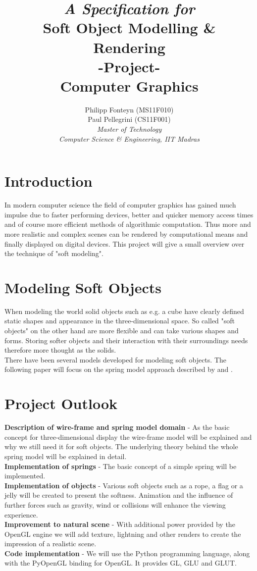 \documentclass[11pt]{article}
\title{
	\emph{A Specification for}\\
	\huge{\textbf{Soft Object Modelling \& Rendering} }\\
	-Project-\\
	Computer Graphics\\[2em]	
}
\author{
	Philipp Fonteyn (MS11F010)\\
	Paul Pellegrini (CS11F001)\\[2em]
	\emph{Master of Technology}\\
	\emph{Computer Science \& Engineering, IIT Madras}
}
\begin{document}
\maketitle
\newpage

%
%
%
\section{Introduction}
In modern computer science the field of computer graphics has gained much impulse due to faster performing devices, better and quicker memory access times and of course more efficient methods of algorithmic computation. Thus more and more realistic and complex scenes can be rendered by computational means and finally displayed on digital devices. This project will give a small overview over the technique of "soft modeling".
%
%
%
\section{Modeling Soft Objects}
When modeling the world solid objects such as e.g. a cube have clearly defined static shapes and appearance in the three-dimensional space. So called "soft objects" on the other hand are more flexible and can take various shapes and forms. Storing softer objects and their interaction with their surroundings needs therefore more thought as the solids.\\[1em]
%
There have been several models developed for modeling soft objects. The following paper will focus on the spring model approach described by \cite{LSCS} and \cite{hair}\cite{gama}.

%
%
%
\section{Project Outlook}
%
\textbf{Description of wire-frame and spring model domain} - As the basic concept for three-dimensional display the wire-frame model will be explained and why we still need it for soft objects. The underlying theory behind the whole spring model will be explained in detail.\\[1em]
%
\textbf{Implementation of springs} - The basic concept of a simple spring will be implemented.\\[1em]
%
\textbf{Implementation of objects} - Various soft objects such as a rope, a flag or a jelly will be created to present the softness. Animation and the influence of further forces such as gravity, wind or collisions will enhance the viewing experience.\\[1em]
%
\textbf{Improvement to natural scene} - With additional power provided by the OpenGL engine \cite{opengl} we will add texture, lightning and other renders to create the impression of a realistic scene.\\[1em]
%
\textbf{Code implementation} - We will use the Python programming language, along with the PyOpenGL binding for OpenGL. It provides GL, GLU and GLUT.
%
\end{document}
